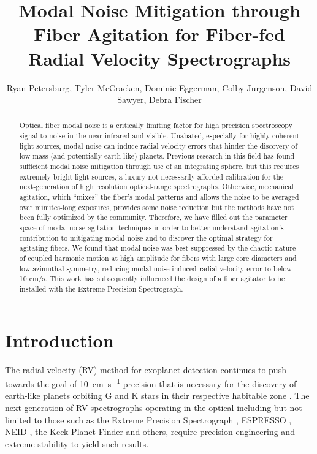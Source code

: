 \documentclass[twocolumn]{emulateapj}
\begin{document}
\title{Modal Noise Mitigation through Fiber Agitation for Fiber-fed Radial Velocity Spectrographs}

\author{Ryan Petersburg, Tyler McCracken, Dominic Eggerman, Colby Jurgenson, David Sawyer, Debra Fischer}

\begin{abstract}

Optical fiber modal noise is a critically limiting factor for high precision spectroscopy signal-to-noise in the near-infrared and visible. Unabated, especially for highly coherent light sources, modal noise can induce radial velocity errors that hinder the discovery of low-mass (and potentially earth-like) planets. Previous research in this field has found sufficient modal noise mitigation through use of an integrating sphere, but this requires extremely bright light sources, a luxury not necessarily afforded calibration for the next-generation of high resolution optical-range spectrographs. Otherwise, mechanical agitation, which ``mixes'' the fiber's modal patterns and allows the noise to be averaged over minutes-long exposures, provides some noise reduction but the methods have not been fully optimized by the community. Therefore, we have filled out the parameter space of modal noise agitation techniques in order to better understand agitation's contribution to mitigating modal noise and to discover the optimal strategy for agitating fibers. We found that modal noise was best suppressed by the chaotic nature of coupled harmonic motion at high amplitude for fibers with large core diameters and low azimuthal symmetry, reducing modal noise induced radial velocity error to below 10 cm/s. This work has subsequently influenced the design of a fiber agitator to be installed with the Extreme Precision Spectrograph.

\end{abstract}


\section{Introduction}
\label{sec:intro}

The radial velocity (RV) method for exoplanet detection continues to push towards the goal of \SI{10}{\centi\meter\per\second} precision that is necessary for the discovery of earth-like planets orbiting G and K stars in their respective habitable zone \citep{Fischer2016}. The next-generation of RV spectrographs operating in the optical including but not limited to those such as the Extreme Precision Spectrograph \citep[EXPRES,][]{Jurgenson2016}, ESPRESSO \citet{Megevand2012}, NEID \cite{}, the Keck Planet Finder\cite{} and others, require precision engineering and extreme stability to yield such results.
\end{document}
